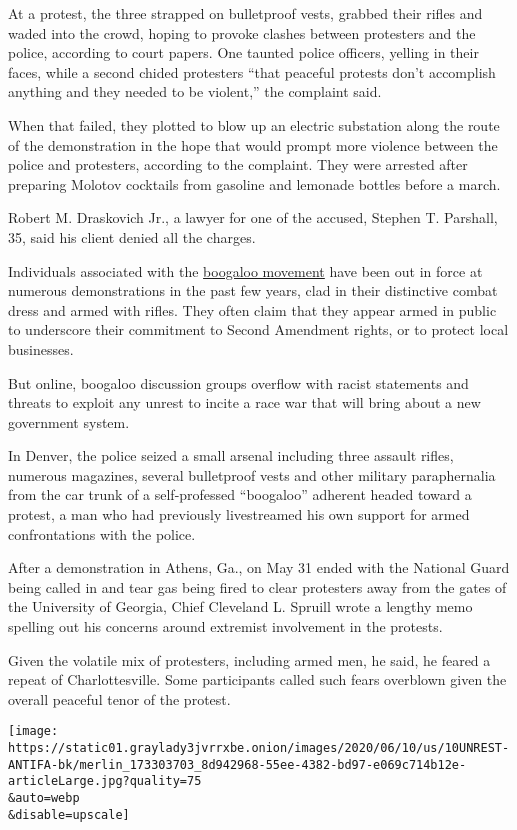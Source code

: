 At a protest, the three strapped on bulletproof vests, grabbed their
rifles and waded into the crowd, hoping to provoke clashes between
protesters and the police, according to court papers. One taunted police
officers, yelling in their faces, while a second chided protesters
``that peaceful protests don't accomplish anything and they needed to be
violent,'' the complaint said.

When that failed, they plotted to blow up an electric substation along
the route of the demonstration in the hope that would prompt more
violence between the police and protesters, according to the complaint.
They were arrested after preparing Molotov cocktails from gasoline and
lemonade bottles before a march.

Robert M. Draskovich Jr., a lawyer for one of the accused, Stephen T.
Parshall, 35, said his client denied all the charges.

Individuals associated with the
\href{https://www.nytimes3xbfgragh.onion/2020/05/03/us/coronavirus-extremists.html}{boogaloo
movement} have been out in force at numerous demonstrations in the past
few years, clad in their distinctive combat dress and armed with rifles.
They often claim that they appear armed in public to underscore their
commitment to Second Amendment rights, or to protect local businesses.

But online, boogaloo discussion groups overflow with racist statements
and threats to exploit any unrest to incite a race war that will bring
about a new government system.

In Denver, the police seized a small arsenal including three assault
rifles, numerous magazines, several bulletproof vests and other military
paraphernalia from the car trunk of a self-professed ``boogaloo''
adherent headed toward a protest, a man who had previously livestreamed
his own support for armed confrontations with the police.

After a demonstration in Athens, Ga., on May 31 ended with the National
Guard being called in and tear gas being fired to clear protesters away
from the gates of the University of Georgia, Chief Cleveland L. Spruill
wrote a lengthy memo spelling out his concerns around extremist
involvement in the protests.

Given the volatile mix of protesters, including armed men, he said, he
feared a repeat of Charlottesville. Some participants called such fears
overblown given the overall peaceful tenor of the protest.

\texttt{[image: https://static01.graylady3jvrrxbe.onion/images/2020/06/10/us/10UNREST-ANTIFA-bk/merlin\_173303703\_8d942968-55ee-4382-bd97-e069c714b12e-articleLarge.jpg?quality=75\\\&auto=webp\\\&disable=upscale]}

